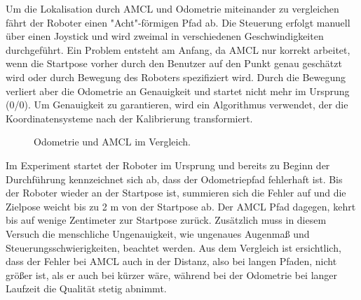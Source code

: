 \documentclass[11pt,a4paper]{article}
\begin{document}
{Um die Lokalisation durch AMCL und Odometrie miteinander zu vergleichen f\"ahrt der Roboter einen "Acht"-f\"ormigen Pfad ab. Die Steuerung erfolgt manuell \"uber einen Joystick und wird zweimal in verschiedenen Geschwindigkeiten durchgef\"uhrt. Ein Problem entsteht am Anfang, da AMCL nur korrekt arbeitet, wenn die Startpose vorher durch den Benutzer auf den Punkt genau gesch\"atzt wird oder durch Bewegung des Roboters spezifiziert wird. Durch die Bewegung verliert aber die Odometrie an Genauigkeit und startet nicht mehr im Ursprung (0/0). Um Genauigkeit zu garantieren, wird ein Algorithmus verwendet, der die Koordinatensysteme nach der Kalibrierung transformiert.

\begin{figure}[h]
	\centering
	\par\medskip
	\caption{ Odometrie und AMCL im Vergleich. }
\end{figure}




Im Experiment startet der Roboter im Ursprung und bereits zu Beginn der Durchf\"uhrung kennzeichnet sich ab, dass der Odometriepfad fehlerhaft ist. Bis der Roboter wieder an der Startpose ist, summieren sich die Fehler auf und die Zielpose weicht bis zu 2 m von der Startpose ab. Der AMCL Pfad dagegen, kehrt bis auf wenige Zentimeter zur Startpose zur\"uck. Zus\"atzlich muss in diesem Versuch die menschliche Ungenauigkeit, wie ungenaues Augenma{\ss} und Steuerungsschwierigkeiten, beachtet werden. Aus dem Vergleich ist ersichtlich, dass der Fehler bei AMCL auch in der Distanz, also bei langen Pfaden, nicht gr\"o{\ss}er ist, als er auch bei k\"urzer w\"are, w\"ahrend bei der Odometrie bei langer Laufzeit die Qualit\"at stetig abnimmt.


}
\end{document}
